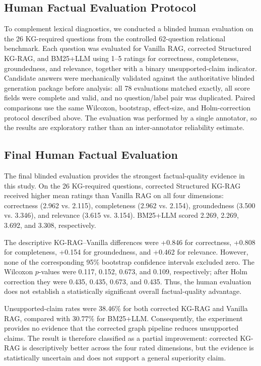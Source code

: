 \documentclass[conference]{IEEEtran}
\begin{document}
\subsection{Human Factual Evaluation Protocol}
\label{sec:res_human}

To complement lexical diagnostics, we conducted a blinded human evaluation on the 26 KG-required questions from the controlled 62-question relational benchmark. Each question was evaluated for Vanilla RAG, corrected Structured KG-RAG, and BM25+LLM using 1--5 ratings for correctness, completeness, groundedness, and relevance, together with a binary unsupported-claim indicator. Candidate answers were mechanically validated against the authoritative blinded generation package before analysis: all 78 evaluations matched exactly, all score fields were complete and valid, and no question/label pair was duplicated. Paired comparisons use the same Wilcoxon, bootstrap, effect-size, and Holm-correction protocol described above. The evaluation was performed by a single annotator, so the results are exploratory rather than an inter-annotator reliability estimate.

\subsection{Final Human Factual Evaluation}
\label{sec:res_human_final}

The final blinded evaluation provides the strongest factual-quality evidence in this study. On the 26 KG-required questions, corrected Structured KG-RAG received higher mean ratings than Vanilla RAG on all four dimensions: correctness (2.962 vs. 2.115), completeness (2.962 vs. 2.154), groundedness (3.500 vs. 3.346), and relevance (3.615 vs. 3.154). BM25+LLM scored 2.269, 2.269, 3.692, and 3.308, respectively.

The descriptive KG-RAG--Vanilla differences were +0.846 for correctness, +0.808 for completeness, +0.154 for groundedness, and +0.462 for relevance. However, none of the corresponding 95\% bootstrap confidence intervals excluded zero. The Wilcoxon $p$-values were 0.117, 0.152, 0.673, and 0.109, respectively; after Holm correction they were 0.435, 0.435, 0.673, and 0.435. Thus, the human evaluation does not establish a statistically significant overall factual-quality advantage.

Unsupported-claim rates were 38.46\% for both corrected KG-RAG and Vanilla RAG, compared with 30.77\% for BM25+LLM. Consequently, the experiment provides no evidence that the corrected graph pipeline reduces unsupported claims. The result is therefore classified as a partial improvement: corrected KG-RAG is descriptively better across the four rated dimensions, but the evidence is statistically uncertain and does not support a general superiority claim.
\end{document}
